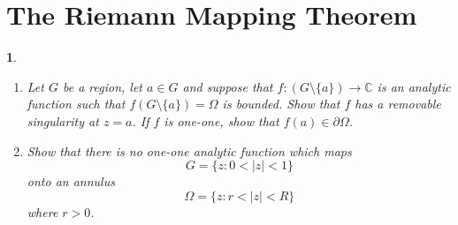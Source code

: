 \documentclass[12pt, a4paper]{report}
\theoremstyle{spaced}
\newtheorem{exercise}{}
\newcommand{\setexercise}[1]{\setcounter{exercise}{#1-1}}
\begin{document}
\section{The Riemann Mapping Theorem}
\setexercise{2}
\begin{exercise}
	\begin{enumerate}[label=(\alph*)]
		\item Let $G$ be a region, let $a\in G$ and suppose that $f:(G\setminus\{a\})\to\mathbb{C}$ is an analytic function such that $f(G\setminus\{a\})=\Omega$ is bounded. Show that $f$ has a removable singularity at $z=a$. If $f$ is one-one, show that $f(a)\in\partial\Omega$.

		\item Show that there is no one-one analytic function which maps
		      \[
			      G=\{z:0<|z|<1\}
		      \]
		      onto an annulus
		      \[
			      \Omega=\{z:r<|z|<R\}
		      \]
		      where $r>0$.
	\end{enumerate}
\end{exercise}
\end{document}
